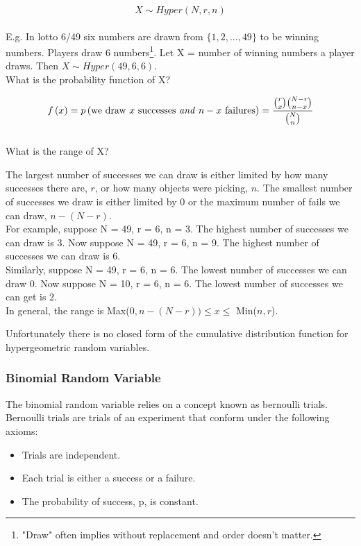 \documentclass[12pt, letterpaper]{article}
\begin{document}
\begin{equation}
X \sim Hyper(N, r, n)
\end{equation}\\

E.g. In lotto 6/49 six numbers are drawn from \(\{1, 2, ..., 49\}\) to be winning numbers. Players draw 6 numbers\footnote{"Draw" often implies without replacement and order doesn't matter.}. Let X = number of winning numbers a player draws. Then \(X \sim Hyper(49, 6, 6)\).\\

What is the probability function of X?

\begin{equation}
f\left(x\right) = p\left(\text{we draw $x$ successes \emph{and} $n - x$ failures}\right) = \frac{{r \choose x}{{N - r} \choose {n - x}}}{{{N} \choose {n}}}
\end{equation}\\

What is the range of X?

The largest number of successes we can draw is either limited by how many successes there are, \(r\), or how many objects were picking, \(n\). The smallest number of successes we draw is either limited by 0 or the maximum number of fails we can draw, \(n - (N - r)\).\\

For example, suppose N = 49, r = 6, n = 3. The highest number of successes we can draw is 3. Now suppose N = 49, r = 6, n = 9. The highest number of successes we can draw is 6.\\

Similarly, suppose N = 49, r = 6, n = 6. The lowest number of successes we can draw 0. Now suppose N = 10, r = 6, n = 6. The lowest number of successes we can get is 2.\\

In general, the range is Max(\(0, n - (N - r)) \leq x \leq \) Min(\(n ,r\)).

Unfortunately there is no closed form of the cumulative distribution function for hypergeometric random variables.

\subsubsection{Binomial Random Variable}
The binomial random variable relies on a concept known as bernoulli trials. Bernoulli trials are trials of an experiment that conform under the following axioms:
\begin{itemize}
\item Trials are independent.
\item Each trial is either a success or a failure.
\item The probability of success, p, is constant.
\end{itemize}
\end{document}
